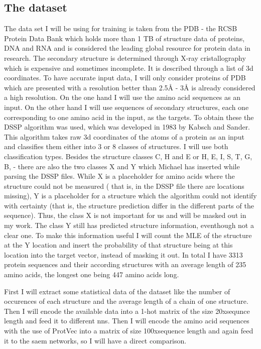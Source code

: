 \documentclass{article}
\begin{document}
\subsection{The dataset}
The data set I will be using for training is taken from the PDB - the RCSB Protein Data Bank \cite{pdb} which holds more than 1 TB of structure data of proteins, DNA and RNA and is considered the leading global resource for protein data in research. The secondary structure is determined through X-ray cristallography which is expensive and sometimes incomplete. It is described through a list of 3d coordinates. To have accurate input data, I will only consider proteins of PDB which are presented with a resolution better than 2.5Å - 3Å is already considered a high resolution.
On the one hand I will use the amino acid sequences as an input. On the other hand I will use sequences of secondary structures, each one corresponding to one amino acid in the input, as the targets. To obtain these the DSSP algorithm was used, which was developed in 1983 by Kabsch and Sander. This algorithm takes raw 3d coordinates of the atoms of a protein as an input and classifies them either into 3 or 8 classes of structures. I will use both classification types. Besides the structure classes C, H and E or H, E, I, S, T, G, B, - there are also the two classes X and Y which Michael has inserted while parsing the DSSP files. While X is a placeholder for amino acids where the structure could not be measured ( that is, in the DSSP file there are locations missing), Y is a placeholder for a structure which the algorithm could not identify with certainty (that is, the structure prediction differ in the different parts of the sequence). Thus, the class X is not important for us and will be masked out in my work. The class Y still has predicted structure information, eventhough not a clear one. To make this information useful I will count the MLE of the structure at the Y location and insert the probability of that structure being at this location into the target vector, instead of masking it out.
In total I have 3313 protein sequences and their according structures with an average length of 235 amino acids, the longest one being 447 amino acids long.

First I will extract some statistical data of the dataset like the number of occurences of each structure and the average length of a chain of one structure. Then I will encode the available data into a 1-hot matrix of the size 20xsequnce length and feed it to different nns. Then I will encode the amino acid sequences with the use of ProtVec into a matrix of size 100xsequence length and again feed it to the saem networks, so I will have a direct comparison.
\end{document}
